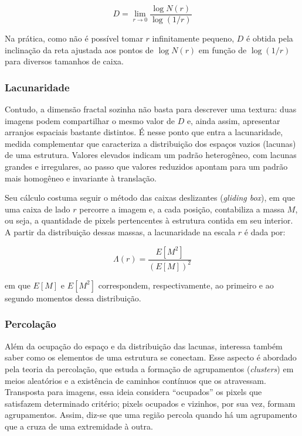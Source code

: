 \begin{equation}
D = \lim_{r \to 0} \frac{\log N(r)}{\log (1/r)}
\end{equation}

Na prática, como não é possível tomar $r$ infinitamente pequeno, $D$ é obtida pela inclinação da reta ajustada aos pontos de $\log N(r)$ em função de $\log(1/r)$ para diversos tamanhos de caixa. %

\subsubsection{Lacunaridade}
\hspace{+15pt}

Contudo, a dimensão fractal sozinha não basta para descrever uma textura: duas imagens podem compartilhar o mesmo valor de $D$ e, ainda assim, apresentar arranjos espaciais bastante distintos. É nesse ponto que entra a lacunaridade, medida complementar que caracteriza a distribuição dos espaços vazios (lacunas) de uma estrutura. Valores elevados indicam um padrão heterogêneo, com lacunas grandes e irregulares, ao passo que valores reduzidos apontam para um padrão mais homogêneo e invariante à translação. %

Seu cálculo costuma seguir o método das caixas deslizantes (\textit{gliding box}), em que uma caixa de lado $r$ percorre a imagem e, a cada posição, contabiliza a massa $M$, ou seja, a quantidade de pixels pertencentes à estrutura contida em seu interior. A partir da distribuição dessas massas, a lacunaridade na escala $r$ é dada por:

\begin{equation}
\Lambda(r) = \frac{E[M^2]}{\left(E[M]\right)^2}
\end{equation}

\noindent em que $E[M]$ e $E[M^2]$ correspondem, respectivamente, ao primeiro e ao segundo momentos dessa distribuição.

\subsubsection{Percolação}
\hspace{+15pt}

Além da ocupação do espaço e da distribuição das lacunas, interessa também saber como os elementos de uma estrutura se conectam. Esse aspecto é abordado pela teoria da percolação, que estuda a formação de agrupamentos (\textit{clusters}) em meios aleatórios e a existência de caminhos contínuos que os atravessam. Transposta para imagens, essa ideia considera ``ocupados'' os pixels que satisfazem determinado critério; pixels ocupados e vizinhos, por sua vez, formam agrupamentos. Assim, diz-se que uma região percola quando há um agrupamento que a cruza de uma extremidade à outra. %

